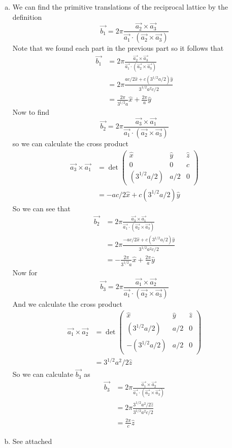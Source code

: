 \documentclass[11pt]{article}
\numberwithin{equation}{section}
\begin{document}
\begin{enumerate}[(a)]
\item
We can find the primitive translations of the reciprocal lattice by the definition 
$$\vec{b_1} = 2\pi\frac{\vec{a_2}\times\vec{a_3}}{\vec{a_1}\cdot(\vec{a_2}\times\vec{a_3})}$$
Note that we found each part in the previous part so it follows that 
\begin{align*}
\vec{b_1} &= 2\pi\frac{\vec{a_2}\times\vec{a_3}}{\vec{a_1}\cdot(\vec{a_2}\times\vec{a_3})}\\
&= 2\pi\frac{ac/2\hat{x} + c(3^{1/2}a/2)\hat{y}}{3^{1/2}a^2c/2}\\
&= \frac{2\pi}{3^{1/2}a}\hat{x} + \frac{2\pi}{a}\hat{y}
\end{align*}
Now to find 
$$\vec{b_2} = 2\pi\frac{\vec{a_3}\times\vec{a_1}}{\vec{a_1}\cdot(\vec{a_2}\times\vec{a_3})}$$
so we can calculate the cross product 
\begin{align*}
\vec{a_3}\times\vec{a_1} &= \det\left(\begin{array}{ccc}
			\hat{x}		&\hat{y}	&\hat{z}\\
			0		&0		&c\\
			(3^{1/2}a/2) 	&a/2		&0
				\end{array}\right)\\
&= -ac/2\hat{x} + c(3^{1/2}a/2)\hat{y}
\end{align*}
So we can see that
\begin{align*}
\vec{b_2} &= 2\pi\frac{\vec{a_3}\times\vec{a_1}}{\vec{a_1}\cdot(\vec{a_2}\times\vec{a_3})}\\
&= 2\pi\frac{-ac/2\hat{x} + c(3^{1/2}a/2)\hat{y}}{3^{1/2}a^2c/2}\\
&= -\frac{2\pi}{3^{1/2}a}\hat{x} + \frac{2\pi}{a}\hat{y}
\end{align*}
Now for
$$\vec{b_3} = 2\pi\frac{\vec{a_1}\times\vec{a_2}}{\vec{a_1}\cdot(\vec{a_2}\times\vec{a_3})}$$
And we calculate the cross product 
\begin{align*}
\vec{a_1}\times\vec{a_2} &= \det\left(\begin{array}{ccc}
			\hat{x}		&\hat{y}	&\hat{z}\\
			(3^{1/2}a/2) 	&a/2		&0\\
			-(3^{1/2}a/2) 	&a/2		&0
				\end{array}\right)\\
&= 3^{1/2}a^2/2\hat{z}
\end{align*}
So we can calculate $\vec{b_3}$ as 
\begin{align*}
\vec{b_3} &= 2\pi\frac{\vec{a_1}\times\vec{a_2}}{\vec{a_1}\cdot(\vec{a_2}\times\vec{a_3})}\\
&= 2\pi\frac{3^{1/2}a^2/2\hat{z}}{3^{1/2}a^2c/2}\\
&= \frac{2\pi}{c}\hat{z}
\end{align*}

\item
See attached

\end{enumerate}
\end{document}

